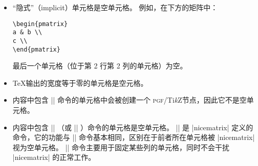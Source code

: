 \documentclass[dvipsnames]{article}%
\def\tikzname{Ti\emph{k}Z}
\begin{document}
\begin{itemize}
\item “隐式”（implicit）单元格是空单元格。 例如，在下方的矩阵中：

\begin{Verbatim}
\begin{pmatrix}
a & b \\
c \\
\end{pmatrix}
\end{Verbatim}

最后一个单元格（位于第 2 行第 2 列的单元格）为空。

\medskip
\item \TeX 输出的宽度等于零的单元格是空元格。

\medskip
\item 内容中包含 |\NotEmpty| 命令的单元格中会被创建一个 \textsc{pgf}/\tikzname 节点，因此它不是空单元格。

\medskip
\item 内容中包含 |\Hspace| （或 |\Hspace*| ）命令的单元格是空单元格。 |\Hspace| 是 |nicematrix| 定义的命令，它的功能与 |\hspace| 命令基本相同，区别在于前者所在单元格被 |nicematrix| 视为空单元格。 |\Hspace| 命令主要用于固定某些列的单元格，同时不会干扰 |nicematrix| 的正常工作。
\end{itemize}


\end{document}
